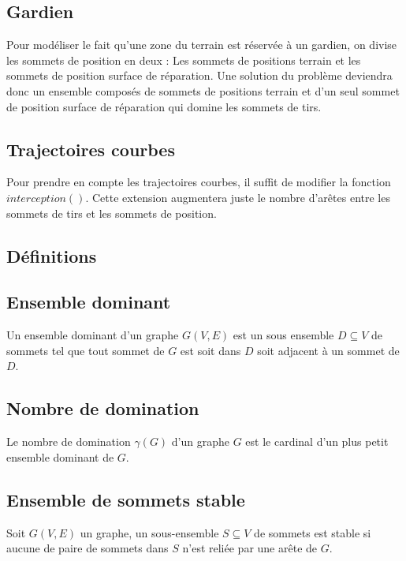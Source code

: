 \documentclass[12pt]{article}
\begin{document}
\subsection{Gardien}
Pour modéliser le fait qu'une zone du terrain est réservée à un gardien, on divise les sommets de position en deux : Les sommets de positions terrain et les sommets de position surface de réparation. Une solution du problème deviendra donc un ensemble composés de sommets de positions terrain et d'un seul sommet de position surface de réparation qui domine les sommets de tirs.

\subsection{Trajectoires courbes}
Pour prendre en compte les trajectoires courbes, il suffit de modifier la fonction $interception()$. Cette extension augmentera juste le nombre d'arêtes entre les sommets de tirs et les sommets de position.

\begin{appendix}
\section{Définitions}
\subsection{Ensemble dominant}
\label{def:ensemble_dominant}
Un ensemble dominant d'un graphe $G(V, E)$ est un sous ensemble $D \subseteq V$ de sommets tel que tout sommet de $G$ est soit dans $D$ soit adjacent à un sommet de $D$.
\subsection{Nombre de domination}
\label{def:nombre_de_domination}
Le nombre de domination $\gamma(G)$ d'un graphe $G$ est le cardinal d'un plus petit ensemble dominant de $G$.
\subsection{Ensemble de sommets stable}
\label{def:ensemble_de_sommets_stable}
Soit $G(V, E)$ un graphe, un sous-ensemble $S \subseteq V$ de sommets est stable si aucune de paire de sommets dans $S$ n'est reliée par une arête de $G$.
\end{appendix}

\end{document}
